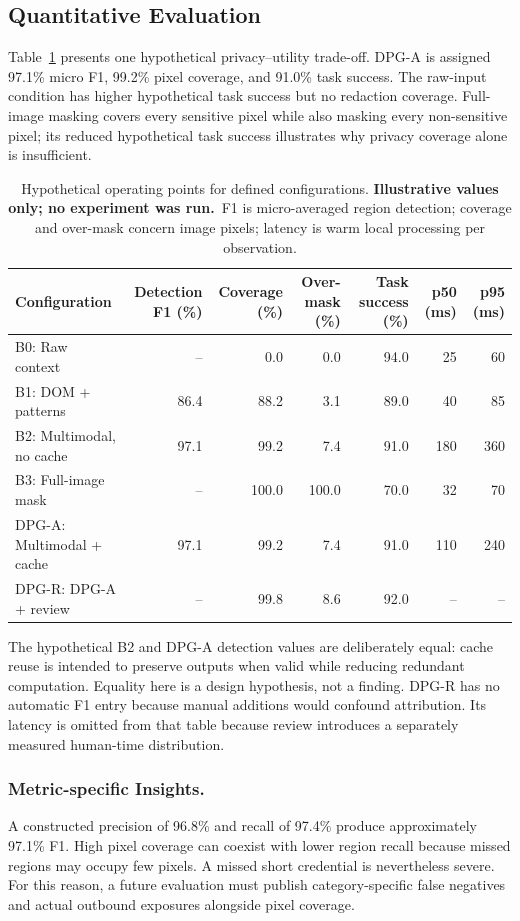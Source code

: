 \documentclass[conference]{IEEEtran}
\newcommand{\illustrative}{\textbf{Illustrative values only; no experiment was run.}}
\begin{document}
\subsection{Quantitative Evaluation}
Table~\ref{tab:main} presents one hypothetical privacy--utility trade-off. DPG-A is assigned 97.1\% micro F1, 99.2\% pixel coverage, and 91.0\% task success. The raw-input condition has higher hypothetical task success but no redaction coverage. Full-image masking covers every sensitive pixel while also masking every non-sensitive pixel; its reduced hypothetical task success illustrates why privacy coverage alone is insufficient.

\begin{table}[t]
\centering\small
\caption{Hypothetical operating points for defined configurations. \illustrative\ F1 is micro-averaged region detection; coverage and over-mask concern image pixels; latency is warm local processing per observation.}
\label{tab:main}
\begin{tabular}{lrrrrrr}
\toprule
Configuration & Detection F1 (\%) & Coverage (\%) & Over-mask (\%) & Task success (\%) & p50 (ms) & p95 (ms)\\
\midrule
B0: Raw context & -- & 0.0 & 0.0 & 94.0 & 25 & 60\\
B1: DOM + patterns & 86.4 & 88.2 & 3.1 & 89.0 & 40 & 85\\
B2: Multimodal, no cache & 97.1 & 99.2 & 7.4 & 91.0 & 180 & 360\\
B3: Full-image mask & -- & 100.0 & 100.0 & 70.0 & 32 & 70\\
DPG-A: Multimodal + cache & 97.1 & 99.2 & 7.4 & 91.0 & 110 & 240\\
DPG-R: DPG-A + review & -- & 99.8 & 8.6 & 92.0 & -- & --\\
\bottomrule
\end{tabular}
\end{table}

The hypothetical B2 and DPG-A detection values are deliberately equal: cache reuse is intended to preserve outputs when valid while reducing redundant computation. Equality here is a design hypothesis, not a finding. DPG-R has no automatic F1 entry because manual additions would confound attribution. Its latency is omitted from that table because review introduces a separately measured human-time distribution.

\subsubsection{Metric-specific Insights.}
A constructed precision of 96.8\% and recall of 97.4\% produce approximately 97.1\% F1. High pixel coverage can coexist with lower region recall because missed regions may occupy few pixels. A missed short credential is nevertheless severe. For this reason, a future evaluation must publish category-specific false negatives and actual outbound exposures alongside pixel coverage.
\end{document}
